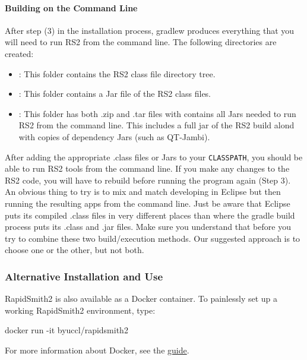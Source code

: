 \begin{enumerate}
  \paragraph{Building on the Command Line} After step (3) in the installation
  process, gradlew produces everything that you will need to run RS2 from the
  command line. The following directories are created: 
  \begin{itemize}
    \item {}: This folder contains the RS2 class file
    directory tree.
    \item {}: This folder contains a Jar file of the RS2 class
    files.
    \item {}: This folder has both .zip and .tar files
    with contains all Jars needed to run RS2 from the command line. This
    includes a full jar of the RS2 build alond with copies of dependency Jars
    (such as QT-Jambi).
  \end{itemize} 
  After adding the appropriate .class files or Jars to your \texttt{CLASSPATH},
  you should be able to run RS2 tools from the command line. If you make any
  changes to the RS2 code, you will have to rebuild before running the program
  again (Step 3).  An obvious thing to try is to mix and match
  developing in Eclipse but then running the resulting apps from the command
  line. Just be aware that Eclipse puts its compiled .class files in very
  different places than where the gradle build process puts its .class and
  .jar files. Make sure you understand that before you try to combine these two
  build/execution methods. Our suggested approach is to choose one or the
  other, but not both.
\end{enumerate}

\subsubsection{Alternative Installation and Use}

RapidSmith2 is also available as a Docker container. To painlessly set up a working RapidSmith2 environment, type:
\vspace{-0.05in}
\begin{code}
docker run -it byuccl/rapidsmith2
\end{code}
\vspace{0.04in}
For more information about Docker, see the \href{https://docs.docker.com/engine/getstarted/}{\color{blue}guide}.

